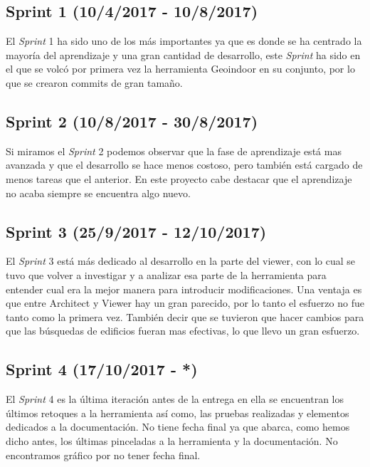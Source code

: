 \subsection{Sprint 1 (10/4/2017 - 10/8/2017)}\label{splrint1}
El \emph{Sprint} 1 ha sido uno de los más importantes ya que es donde se ha centrado la mayoría del aprendizaje y una gran cantidad de desarrollo, este \emph{Sprint} ha sido en el que se volcó por primera vez la herramienta Geoindoor en su conjunto, por lo que se crearon commits de gran tamaño.


\subsection{Sprint 2 (10/8/2017 - 30/8/2017)}\label{splrint2}
Si miramos el \emph{Sprint} 2 podemos observar que la fase de aprendizaje está mas avanzada y que el desarrollo se hace menos costoso, pero también está cargado de menos tareas que el anterior. En este proyecto cabe destacar que el aprendizaje no acaba siempre se encuentra algo nuevo.


\subsection{Sprint 3 (25/9/2017 - 12/10/2017)}\label{splrint3}
El \emph{Sprint} 3 está más dedicado al desarrollo en la parte del viewer, con lo cual se tuvo que volver a investigar y a analizar esa parte de la herramienta para entender cual era la mejor manera para introducir modificaciones. Una ventaja es que entre Architect y Viewer hay un gran parecido, por lo tanto el esfuerzo no fue tanto como la primera vez. También decir que se tuvieron que hacer cambios para que las búsquedas de edificios fueran mas efectivas, lo que llevo un gran esfuerzo.


\subsection{Sprint 4 (17/10/2017 - *)}\label{splrint3}
El \emph{Sprint} 4 es la última iteración antes de la entrega en ella se encuentran los últimos retoques a la herramienta así como, las pruebas realizadas y elementos dedicados a la documentación.
No tiene fecha final ya que abarca, como hemos dicho antes, los últimas pinceladas a la herramienta y la documentación. No encontramos gráfico por no tener fecha final.
 
